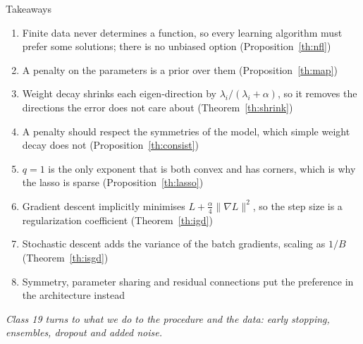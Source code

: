 \documentclass[aspectratio=169, 11pt]{beamer}
\newcommand{\bridge}[1]{%
  {\scriptsize\itshape\color{mcMuted} #1\par}\vspace{0.35em}}
\newcommand{\nosrc}{}       %
\begin{document}
\begin{frame}{Takeaways}
  \nosrc
  \vspace{0.1em}
  {\scriptsize
  \begin{enumerate}\itemsep0.34em
    \item Finite data never determines a function, so every learning
          algorithm must prefer some solutions; there is no unbiased
          option (Proposition~\ref{th:nfl})
    \item A penalty on the parameters is a prior over them
          (Proposition~\ref{th:map})
    \item Weight decay shrinks each eigen-direction by
          $\lambda_i/(\lambda_i + \alpha)$, so it removes the directions
          the error does not care about (Theorem~\ref{th:shrink})
    \item A penalty should respect the symmetries of the model, which
          simple weight decay does not (Proposition~\ref{th:consist})
    \item $q = 1$ is the only exponent that is both convex and has
          corners, which is why the lasso is sparse
          (Proposition~\ref{th:lasso})
    \item Gradient descent implicitly minimises
          $L + \tfrac{\alpha}{4}\|\nabla L\|^2$, so the step size is a
          regularization coefficient (Theorem~\ref{th:igd})
    \item Stochastic descent adds the variance of the batch gradients,
          scaling as $1/B$ (Theorem~\ref{th:isgd})
    \item Symmetry, parameter sharing and residual connections put the
          preference in the architecture instead
  \end{enumerate}}
  \bridge{Class 19 turns to what we do to the procedure and the data:
  early stopping, ensembles, dropout and added noise.}
\end{frame}
\end{document}

